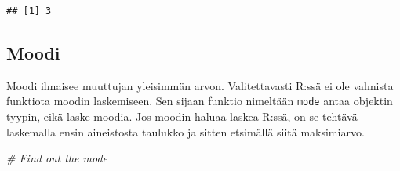 \documentclass[
]{book}
\newenvironment{Shaded}{\begin{snugshade}}{\end{snugshade}}
\newcommand{\CommentTok}[1]{\textcolor[rgb]{0.56,0.35,0.01}{\textit{#1}}}
\begin{document}
\begin{verbatim}
## [1] 3
\end{verbatim}

\hypertarget{moodi}{%
\subsection{Moodi}\label{moodi}}

Moodi ilmaisee muuttujan yleisimmän arvon. Valitettavasti R:ssä ei ole valmista funktiota moodin laskemiseen. Sen sijaan funktio nimeltään \texttt{mode} antaa objektin tyypin, eikä laske moodia. Jos moodin haluaa laskea R:ssä, on se tehtävä laskemalla ensin aineistosta taulukko ja sitten etsimällä siitä maksimiarvo.

\begin{Shaded}
\begin{Highlighting}[]
\CommentTok{\# Find out the mode}

\end{Highlighting}
\end{Shaded}
\end{document}
